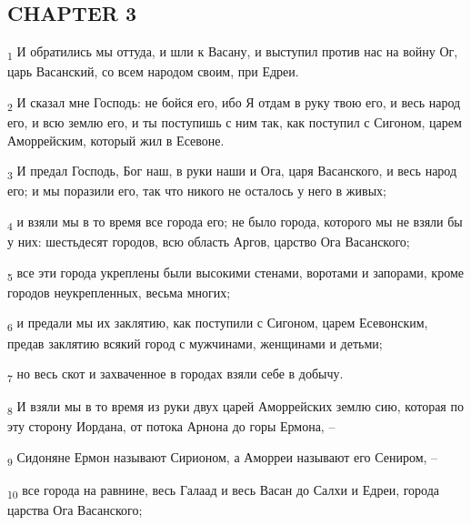 \subsection{CHAPTER 3}
\begin{tcolorbox}
\textsubscript{1} И обратились мы оттуда, и шли к Васану, и выступил против нас на войну Ог, царь Васанский, со всем народом своим, при Едреи.
\end{tcolorbox}
\begin{tcolorbox}
\textsubscript{2} И сказал мне Господь: не бойся его, ибо Я отдам в руку твою его, и весь народ его, и всю землю его, и ты поступишь с ним так, как поступил с Сигоном, царем Аморрейским, который жил в Есевоне.
\end{tcolorbox}
\begin{tcolorbox}
\textsubscript{3} И предал Господь, Бог наш, в руки наши и Ога, царя Васанского, и весь народ его; и мы поразили его, так что никого не осталось у него в живых;
\end{tcolorbox}
\begin{tcolorbox}
\textsubscript{4} и взяли мы в то время все города его; не было города, которого мы не взяли бы у них: шестьдесят городов, всю область Аргов, царство Ога Васанского;
\end{tcolorbox}
\begin{tcolorbox}
\textsubscript{5} все эти города укреплены были высокими стенами, воротами и запорами, кроме городов неукрепленных, весьма многих;
\end{tcolorbox}
\begin{tcolorbox}
\textsubscript{6} и предали мы их заклятию, как поступили с Сигоном, царем Есевонским, предав заклятию всякий город с мужчинами, женщинами и детьми;
\end{tcolorbox}
\begin{tcolorbox}
\textsubscript{7} но весь скот и захваченное в городах взяли себе в добычу.
\end{tcolorbox}
\begin{tcolorbox}
\textsubscript{8} И взяли мы в то время из руки двух царей Аморрейских землю сию, которая по эту сторону Иордана, от потока Арнона до горы Ермона, --
\end{tcolorbox}
\begin{tcolorbox}
\textsubscript{9} Сидоняне Ермон называют Сирионом, а Аморреи называют его Сениром, --
\end{tcolorbox}
\begin{tcolorbox}
\textsubscript{10} все города на равнине, весь Галаад и весь Васан до Салхи и Едреи, города царства Ога Васанского;
\end{tcolorbox}
